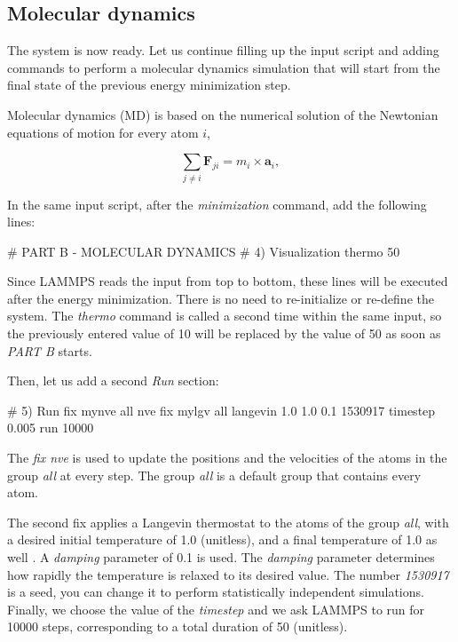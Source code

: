 \subsection{Molecular dynamics}
The system is now ready. Let us continue filling up the
input script and adding commands to perform a molecular dynamics
simulation that will start from the final state of the previous energy
minimization step.

\begin{tcolorbox}[colback=mylightblue!5!white,colframe=mylightblue!75!black,title=Background Information -- What is molecular dynamics?]

\vspace{0.25cm} \noindent Molecular dynamics (MD) is based on the numerical solution of the Newtonian
equations of motion for every atom $i$,

$$\sum_{j \ne i} \boldsymbol{F}_{ji} = m_i \times \boldsymbol{a}_i,$$
\end{tcolorbox}

\noindent In the same input script, after the \textit{minimization} command, add the following
lines:

\begin{lcverbatim}
# PART B - MOLECULAR DYNAMICS
# 4) Visualization
thermo 50
\end{lcverbatim}

\noindent Since LAMMPS reads the input from top to bottom, these lines will be
executed after the energy minimization. There is no need to re-initialize
or re-define the system. The \textit{thermo} command is called a second time within
the same input, so the previously entered value of 10 will be replaced by
the value of 50 as soon as \textit{PART B} starts.

\vspace{0.25cm} \noindent Then, let us add a second \textit{Run} section:

\begin{lcverbatim}
# 5) Run
fix mynve all nve
fix mylgv all langevin 1.0 1.0 0.1 1530917
timestep 0.005
run 10000
\end{lcverbatim}

\noindent The \textit{fix nve} is used to update the positions and the velocities of the
atoms in the group \textit{all} at every step. The group \textit{all} is a default group
that contains every atom.

\vspace{0.25cm} \noindent The second fix applies a Langevin thermostat to the atoms of the group
\textit{all}, with a desired initial temperature of 1.0 (unitless), and a final
temperature of 1.0 as well \cite{schneider1978molecular}.
A \textit{damping} parameter of 0.1 is used. The \textit{damping}
parameter determines how rapidly the temperature is relaxed to its desired value.
The number \textit{1530917} is a seed, you can
change it to perform statistically independent simulations.
Finally, we choose the value of the \textit{timestep} and we ask LAMMPS to
run for 10000 steps, corresponding to a total duration of 50 (unitless).

